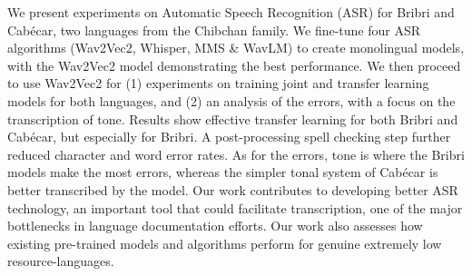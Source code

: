 We present experiments on Automatic Speech Recognition (ASR) for Bribri and Cabécar, two languages from the Chibchan family. We fine-tune four ASR algorithms (Wav2Vec2, Whisper, MMS \& WavLM) to create monolingual models, with the Wav2Vec2 model demonstrating the best performance. We then proceed to use Wav2Vec2 for (1) experiments on training joint and transfer learning models for both languages, and (2) an analysis of the errors, with a focus on the transcription of tone. Results show effective transfer learning for both Bribri and Cabécar, but especially for Bribri. A post-processing spell checking step further reduced character and word error rates. As for the errors, tone is where the Bribri models make the most errors, whereas the simpler tonal system of Cabécar is better transcribed by the model. Our work contributes to developing better ASR technology, an important tool that could facilitate transcription, one of the major bottlenecks in language documentation efforts. Our work also assesses how existing pre-trained models and algorithms perform for genuine extremely low resource-languages.